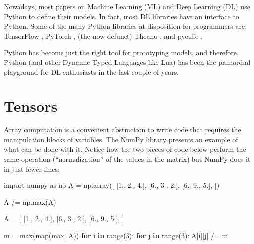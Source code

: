 \documentclass[
11pt, %
english, %
singlespacing, %
headsepline, %
]{MastersDoctoralThesis} %
\newenvironment{Shaded}{}{}
\newcommand{\BuiltInTok}[1]{#1}
\newcommand{\ControlFlowTok}[1]{\textcolor[rgb]{0.00,0.44,0.13}{\textbf{#1}}}
\newcommand{\DecValTok}[1]{\textcolor[rgb]{0.25,0.63,0.44}{#1}}
\newcommand{\FloatTok}[1]{\textcolor[rgb]{0.25,0.63,0.44}{#1}}
\newcommand{\ImportTok}[1]{#1}
\newcommand{\KeywordTok}[1]{\textcolor[rgb]{0.00,0.44,0.13}{\textbf{#1}}}
\newcommand{\NormalTok}[1]{#1}
\newcommand{\OperatorTok}[1]{\textcolor[rgb]{0.40,0.40,0.40}{#1}}
\begin{document}
Nowadays, most papers on Machine Learning (ML) and Deep Learning (DL)
use Python to define their models. In fact, most DL libraries have an
interface to Python. Some of the many Python libraries at disposition
for programmers are: TensorFlow \autocite{abadi_tensorflow_2016},
PyTorch \autocite{paszke2017pytorch}, (the now defunct) Theano
\autocite{bergstra2011theano}, and pycaffe \autocite[as part of the
Caffe framework]{jia2014caffe}.

Python has become just the right tool for prototyping models, and
therefore, Python (and other Dynamic Typed Languages like Lua) has been
the primordial playground for DL enthusiasts in the last couple of
years.

\hypertarget{tensors}{%
\section{Tensors}\label{tensors}}

Array computation is a convenient abstraction to write code that
requires the manipulation blocks of variables. The NumPy library
presents an example of what can be done with it. Notice how the two
pieces of code below perform the same operation (\enquote{normalization}
of the values in the matrix) but NumPy does it in just fewer lines:

\begin{Shaded}
\begin{Highlighting}[]
\ImportTok{import}\NormalTok{ numpy }\ImportTok{as}\NormalTok{ np}
\NormalTok{A }\OperatorTok{=}\NormalTok{ np.array([}
\NormalTok{  [}\FloatTok{1.}\NormalTok{, }\FloatTok{2.}\NormalTok{, }\FloatTok{4.}\NormalTok{],}
\NormalTok{  [}\FloatTok{6.}\NormalTok{, }\FloatTok{3.}\NormalTok{, }\FloatTok{2.}\NormalTok{],}
\NormalTok{  [}\FloatTok{6.}\NormalTok{, }\FloatTok{9.}\NormalTok{, }\FloatTok{5.}\NormalTok{],}
\NormalTok{])}

\NormalTok{A }\OperatorTok{/=}\NormalTok{ np.}\BuiltInTok{max}\NormalTok{(A)}
\end{Highlighting}
\end{Shaded}

\begin{Shaded}
\begin{Highlighting}[]
\NormalTok{A }\OperatorTok{=}\NormalTok{ [}
\NormalTok{  [}\FloatTok{1.}\NormalTok{, }\FloatTok{2.}\NormalTok{, }\FloatTok{4.}\NormalTok{],}
\NormalTok{  [}\FloatTok{6.}\NormalTok{, }\FloatTok{3.}\NormalTok{, }\FloatTok{2.}\NormalTok{],}
\NormalTok{  [}\FloatTok{6.}\NormalTok{, }\FloatTok{9.}\NormalTok{, }\FloatTok{5.}\NormalTok{],}
\NormalTok{]}

\NormalTok{m }\OperatorTok{=} \BuiltInTok{max}\NormalTok{(}\BuiltInTok{map}\NormalTok{(}\BuiltInTok{max}\NormalTok{, A))}
\ControlFlowTok{for}\NormalTok{ i }\KeywordTok{in} \BuiltInTok{range}\NormalTok{(}\DecValTok{3}\NormalTok{):}
  \ControlFlowTok{for}\NormalTok{ j }\KeywordTok{in} \BuiltInTok{range}\NormalTok{(}\DecValTok{3}\NormalTok{):}
\NormalTok{    A[i][j] }\OperatorTok{/=}\NormalTok{ m}
\end{Highlighting}
\end{Shaded}
\end{document}
